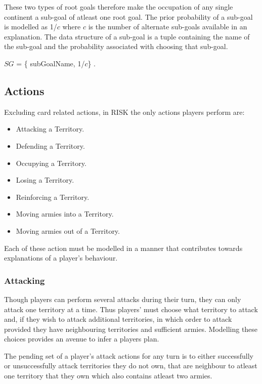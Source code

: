 \documentclass[parskip]{cs4rep}
\begin{document}
These two types of root goals therefore make the occupation of any single continent a sub-goal of atleast one root goal. The prior probability of a sub-goal is modelled as 1/$c$ where $c$ is the number of alternate sub-goals available in an explanation. The data structure of a sub-goal is a tuple containing the name of the sub-goal and the probability associated with choosing that sub-goal.\newline

\centerline{
 $SG$ = \{ subGoalName, 1/$c$\} .
}

\subsection{Actions}

Excluding card related actions, in RISK the only actions players perform are:

\begin{itemize}
\item
Attacking a Territory.
\item
Defending a Territory.
\item
Occupying a Territory.
\item
Losing a Territory.
\item
Reinforcing a Territory.
\item
Moving armies into a Territory.
\item
Moving armies out of a Territory.
\end{itemize}

Each of these action must be modelled in a manner that contributes towards explanations of a player's behaviour.

\subsubsection{Attacking}

Though players can perform several attacks during their turn, they can only attack one territory at a time. Thus players' must choose what territory to attack and, if they wish to attack additional territories, in which order to attack provided they have neighbouring territories and sufficient armies. Modelling these choices provides an avenue to infer a players plan.

The pending set of a player's attack actions for any turn is to either successfully or unsuccessfully attack territories they do not own, that are neighbour to atleast one territory that they own which also contains atleast two armies.
\end{document}
